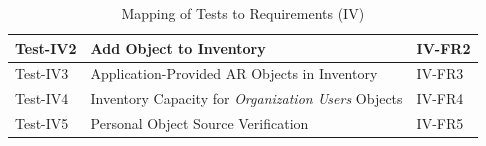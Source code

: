 \documentclass[12pt, titlepage]{article}
\begin{document}
\begin{table}[htpb!]
\begin{tabular}{|l|p{8cm}|p{3cm}|}
    \hline
    Test-IV2         & Add Object to Inventory                                                     & IV-FR2                \\
    \hline
    Test-IV3         & Application-Provided AR Objects in Inventory                                & IV-FR3                \\
    \hline
    Test-IV4         & Inventory Capacity for \textit{Organization Users} Objects                  & IV-FR4                \\
    \hline
    Test-IV5         & Personal Object Source Verification                                         & IV-FR5                \\
    \hline
  \end{tabular}
  \caption{Mapping of Tests to Requirements (IV)}
  \label{tab:test_requirements4}
\end{table}
\end{document}
